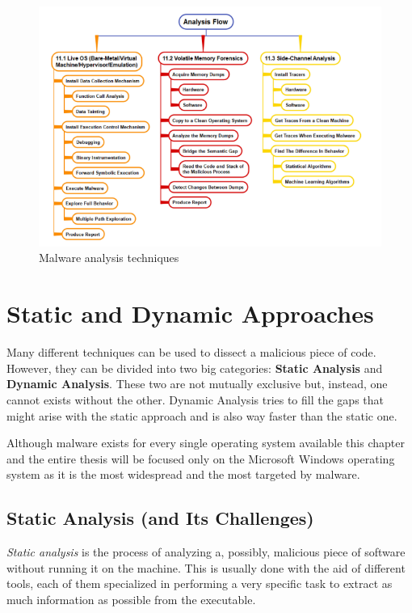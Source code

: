 \begin{figure}[t!]
\centering
\includegraphics[width=\linewidth]{images/dynanalysis.png}
\caption{Malware analysis techniques}
\label{fig:mat}
\end{figure}

\section{Static and Dynamic Approaches}

Many different techniques can be used to dissect a malicious piece of code. However, they can be divided into two big categories: \textbf{Static Analysis} and \textbf{Dynamic Analysis}. These two are not mutually exclusive but, instead, one cannot exists without the other. Dynamic Analysis tries to fill the gaps that might arise with the static approach and is also way faster than the static one.

Although malware exists for every single operating system available this chapter and the entire thesis will be focused only on the Microsoft Windows operating system as it is the most widespread and the most targeted by malware. 

\subsection*{Static Analysis (and Its Challenges)}

\textit{Static analysis} is the process of analyzing a, possibly, malicious piece of software without running it on the machine. This is usually done with the aid of different tools, each of them specialized in performing a very specific task to extract as much information as possible from the executable. 

